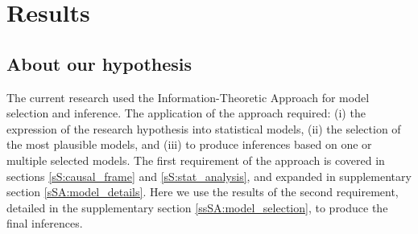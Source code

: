 \section{Results} \label{S:results}
%
\subsection{About our hypothesis} \label{sS:results_hypothesis}
%
The current research used the Information-Theoretic Approach \citep{Anderson_2008, Chamberlain_1965} for model selection and inference. The application of the approach required: (i) the expression of the research hypothesis into statistical models, (ii) the selection of the most plausible models, and (iii) to produce inferences based on one or multiple selected models. The first requirement of the approach is covered in sections \ref{sS:causal_frame} and \ref{sS:stat_analysis}, and expanded in supplementary section \ref{sSA:model_details}. Here we use the results of the second requirement, detailed in the supplementary section \ref{ssSA:model_selection}, to produce the final inferences. 

